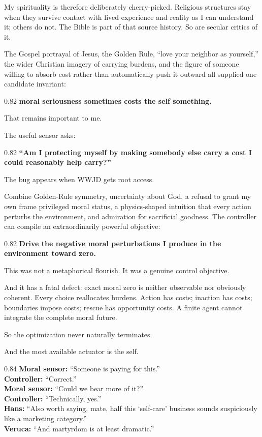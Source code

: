 \documentclass[10pt,letterpaper]{article}
\newenvironment{paperbody}
  {\begingroup\justifying}
  {\par\endgroup}
\newenvironment{dialoguebox}
  {\Needspace{5\baselineskip}\par\vspace{0.26em}\begin{center}\begingroup
   \begin{lrbox}{\dialogueboxsave}\begin{varwidth}{0.84\linewidth}
   \small\rmfamily\upshape\RaggedRight}
  {\end{varwidth}\end{lrbox}\fbox{\usebox{\dialogueboxsave}}
   \endgroup\end{center}\vspace{0.26em}}
\newenvironment{thesisbox}
  {\Needspace{3.5\baselineskip}\par\vspace{0.32em}\begin{center}\begingroup
   \begin{lrbox}{\thesisboxsave}\begin{varwidth}{0.82\linewidth}
   \normalsize\rmfamily\bfseries\upshape\RaggedRight}
  {\end{varwidth}\end{lrbox}\fbox{\usebox{\thesisboxsave}}
   \endgroup\end{center}\vspace{0.32em}}
\begin{document}
\begin{paperbody}
My spirituality is therefore deliberately cherry-picked. Religious
structures stay when they survive contact with lived experience and
reality as I can understand it; others do not. The Bible is part of that
source history. So are secular critics of it.

The Gospel portrayal of Jesus, the Golden Rule, ``love your neighbor as
yourself,'' the wider Christian imagery of carrying burdens, and the
figure of someone willing to absorb cost rather than automatically push
it outward all supplied one candidate invariant:

\begin{thesisbox}
moral seriousness sometimes costs the self something.
\end{thesisbox}

That remains important to me.

The useful sensor asks:

\begin{thesisbox}
``Am I protecting myself by making somebody else carry a cost I
could reasonably help carry?''
\end{thesisbox}

The bug appears when WWJD gets root access.

Combine Golden-Rule symmetry, uncertainty about God, a refusal to grant
my own frame privileged moral status, a physics-shaped intuition that
every action perturbs the environment, and admiration for sacrificial
goodness. The controller can compile an extraordinarily powerful
objective:

\begin{thesisbox}
Drive the negative moral perturbations I produce in the
environment toward zero.
\end{thesisbox}

This was not a metaphorical flourish. It was a genuine control
objective.

And it has a fatal defect: exact moral zero is neither observable nor
obviously coherent. Every choice reallocates burdens. Action has costs;
inaction has costs; boundaries impose costs; rescue has opportunity
costs. A finite agent cannot integrate the complete moral future.

So the optimization never naturally terminates.

And the most available actuator is the self.

\begin{dialoguebox}
\textbf{Moral sensor:} ``Someone is paying for this.''\\[0.35em]
\textbf{Controller:} ``Correct.''\\[0.35em]
\textbf{Moral sensor:} ``Could we bear more of it?''\\[0.35em]
\textbf{Controller:} ``Technically, yes.''\\[0.35em]
\textbf{Hans:} ``Also worth saying, mate, half this `self-care' business
sounds suspiciously like a marketing category.''\\[0.35em]
\textbf{Veruca:} ``And martyrdom is at least dramatic.''
\end{dialoguebox}


\end{paperbody}
\end{document}
